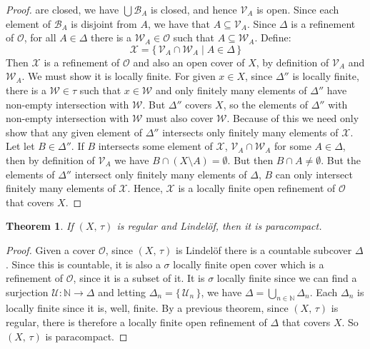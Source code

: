 \documentclass{article}
\theoremstyle{plain}
\newtheorem{theorem}{Theorem}[section]
\theoremstyle{normal}
\begin{document}
\begin{proof}
            are closed, we have $\bigcup\mathcal{B}_{A}$ is closed, and hence
            $\mathcal{V}_{A}$ is open. Since each element of $\mathcal{B}_{A}$
            is disjoint from $A$, we have that $A\subseteq\mathcal{V}_{A}$.
            Since $\Delta$ is a refinement of $\mathcal{O}$, for all
            $A\in\Delta$ there is a $\mathcal{W}_{A}\in\mathcal{O}$ such that
            $A\subseteq\mathcal{W}_{A}$. Define:
            \begin{equation}
                \mathcal{X}=
                \{\,\mathcal{V}_{A}\cap\mathcal{W}_{A}\;|\;A\in\Delta\,\}
            \end{equation}
            Then $\mathcal{X}$ is a refinement of $\mathcal{O}$ and also an
            open cover of $X$, by definition of $\mathcal{V}_{A}$ and
            $\mathcal{W}_{A}$. We must show it is locally finite.
            For given $x\in{X}$, since $\Delta''$ is
            locally finite, there is a $\mathcal{W}\in\tau$ such that
            $x\in\mathcal{W}$ and only finitely many elements of $\Delta''$
            have non-empty intersection with $\mathcal{W}$. But
            $\Delta''$ covers $X$, so the elements of $\Delta''$ with non-empty
            intersection with $\mathcal{W}$ must also cover $\mathcal{W}$.
            Because of this we need only show that any given element of
            $\Delta''$ intersects only finitely many elements of $\mathcal{X}$.
            Let let $B\in\Delta''$. If $B$ intersects some element of
            $\mathcal{X}$, $\mathcal{V}_{A}\cap\mathcal{W}_{A}$ for some
            $A\in\Delta$, then by definition of $\mathcal{V}_{A}$ we have
            $B\cap(X\setminus{A})=\emptyset$. But then $B\cap{A}\ne\emptyset$.
            But the elements of $\Delta''$ intersect only finitely many elements
            of $\Delta$, $B$ can only intersect finitely many elements of
            $\mathcal{X}$. Hence, $\mathcal{X}$ is a locally finite open
            refinement of $\mathcal{O}$ that covers $X$.
        \end{proof}
        \begin{theorem}
            If $(X,\,\tau)$ is regular and Lindel\"{o}f, then it is
            paracompact.
        \end{theorem}
        \begin{proof}
            Given a cover $\mathcal{O}$, since $(X,\,\tau)$ is Lindel\"{o}f
            there is a countable subcover $\Delta$. Since this is countable, it
            is also a $\sigma$ locally finite open cover which is a refinement
            of $\mathcal{O}$, since it is a subset of it. It is $\sigma$
            locally finite since we can find a surjection
            $\mathcal{U}:\mathbb{N}\rightarrow\Delta$ and letting
            $\Delta_{n}=\{\,\mathcal{U}_{n}\,\}$, we have
            $\Delta=\bigcup_{n\in\mathbb{N}}\Delta_{n}$. Each $\Delta_{n}$ is
            locally finite since it is, well, finite. By a previous theorem,
            since $(X,\,\tau)$ is regular, there is therefore a locally finite
            open refinement of $\Delta$ that covers $X$. So $(X,\,\tau)$ is
            paracompact.
        \end{proof}
\end{document}
